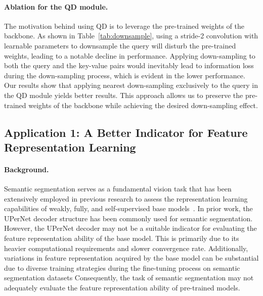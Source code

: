 \paragraph{Ablation for the QD module.}
The motivation behind using QD is to leverage the pre-trained weights of the backbone. 
As shown in Table~\ref{tab:downsample}, using a stride-2 convolution with learnable parameters to downsample the query will disturb the pre-trained weights, leading to a notable decline in performance.
Applying down-sampling to both the query and the key-value pairs would inevitably lead to information loss during the down-sampling process, which is evident in the lower performance.
Our results show that 
applying  nearest down-sampling exclusively to the query in the QD module yields better results. This approach allows us to preserve the pre-trained weights of the backbone while achieving the desired down-sampling effect.

\subsection{Application 1: A Better Indicator for Feature Representation Learning} 
\paragraph{Background.} Semantic segmentation serves as a fundamental vision task that has been extensively employed in previous research to assess the representation learning capabilities of weakly, fully, and self-supervised base models~\cite{he2022masked,chen2022context,touvron2022deit,beitv2}. In prior work, the UPerNet decoder structure has been commonly used for semantic segmentation. However, the UPerNet decoder may not be a suitable indicator for evaluating the feature representation ability of the base model. This is primarily due to its heavier computational requirements and slower convergence rate. 
Additionally, variations in feature representation acquired by the base model can be substantial due to diverse training strategies during the fine-tuning process on semantic segmentation datasets
Consequently, the task of semantic segmentation may not adequately evaluate the feature representation ability of pre-trained models.


